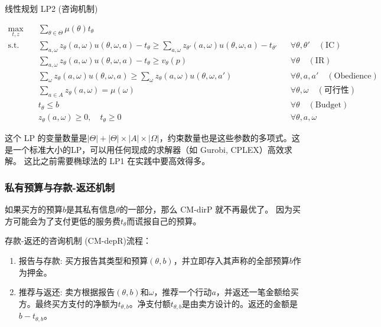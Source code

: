 线性规划 LP2 (咨询机制)

\begin{align*}
    \max_{t,z} \quad & \sum_{\theta \in \Theta} \mu(\theta) t_{\theta} \\
    \text{s.t.} \quad & \sum_{a, \omega} z_{\theta}(a, \omega) u(\theta, \omega, a) - t_{\theta} \geq \sum_{a, \omega} z_{\theta'}(a, \omega) u(\theta, \omega, a) - t_{\theta'} && \forall \theta, \theta' \quad (\text{IC}) \\
    & \sum_{a, \omega} z_{\theta}(a, \omega) u(\theta, \omega, a) - t_{\theta} \geq v_{\theta}(p) && \forall \theta \quad (\text{IR}) \\
    & \sum_{\omega} z_{\theta}(a, \omega) u(\theta, \omega, a) \geq \sum_{\omega} z_{\theta}(a, \omega) u(\theta, \omega, a') && \forall \theta, a, a' \quad (\text{Obedience}) \\
    & \sum_{a \in A} z_{\theta}(a, \omega) = \mu(\omega) && \forall \theta, \omega \quad (\text{可行性}) \\
    & t_{\theta} \leq b && \forall \theta \quad (\text{Budget}) \\
    & z_{\theta}(a, \omega) \geq 0, \quad t_{\theta} \geq 0 && \forall \theta, a, \omega
\end{align*}

这个 LP 的变量数量是$|\Theta|+|\Theta|\times |A|\times |\Omega|$，约束数量也是这些参数的多项式。这是一个标准大小的LP，可以用任何现成的求解器（如 Gurobi, CPLEX）高效求解。
这比之前需要椭球法的 LP1 在实践中要高效得多。

\subsubsection{私有预算与存款-返还机制}

如果买方的预算$b$是其私有信息$\theta$的一部分，那么 CM-dirP 就不再最优了。
因为买方可能会为了支付更低的服务费$t_\theta$而谎报自己的预算。

存款-返还的咨询机制 (CM-depR)流程：

\begin{enumerate}
    \item 报告与存款: 买方报告其类型和预算$(\theta,b)$，并立即存入其声称的全部预算$b$作为押金。
    \item 推荐与返还: 卖方根据报告$(\theta,b)$和$\omega$，推荐一个行动$a$，并返还一笔金额给买方。最终买方支付的净额为$t_{\theta,b}$。净支付额$t_{\theta,b}$是由卖方设计的。返还的金额是$b-t_{\theta,b}$。
\end{enumerate}

